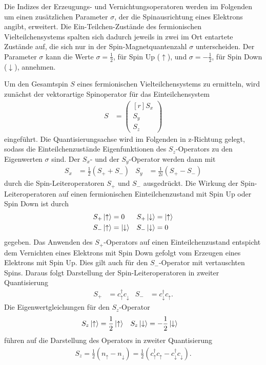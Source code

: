 Die Indizes der Erzeugungs- und Vernichtungsoperatoren werden im Folgenden um einen zusätzlichen Parameter $\sigma$, der die Spinausrichtung eines Elektrons angibt, erweitert.
Die Ein-Teilchen-Zustände des fermionischen Vielteilchensystems spalten sich dadurch jeweils in zwei im Ort entartete Zustände auf, die sich nur in der Spin-Magnetquantenzahl $\sigma$ unterscheiden.
Der Parameter $\sigma$ kann die Werte $\sigma = \frac12$, für Spin Up ($\uparrow$), und $\sigma = -\frac12$, für Spin Down ($\downarrow$), annehmen.

Um den Gesamtspin $S$ eines fermionischen Vielteilchensystems zu ermitteln, wird zunächst der vektorartige Spinoperator für das Einteilchensystem
\begin{align}
  S & = \begin{pmatrix*}[r]
    S_x \\
    S_y \\
    S_z
  \end{pmatrix*}
  \label{eqn:spinoperator}
\end{align}
eingeführt. Die Quantisierungsachse wird im Folgenden in z-Richtung gelegt, sodass die Einteilchenzustände Eigenfunktionen des $S_z$-Operators zu den Eigenwerten $\sigma$ sind.
Der $S_x$- und der $S_y$-Operator werden dann mit
\begin{align}
  S_x & = \frac12 \left(S_+ + S_- \right) & S_y &= \frac1{2i} \left(S_+ - S_- \right)
  \label{eqn:leiteroperatorenausdruck}
\end{align}
durch die Spin-Leiteroperatoren $S_+$ und $S_-$ ausgedrückt. Die Wirkung der Spin-Leiteroperatoren auf einen fermionischen Einteilchenzustand mit Spin Up oder Spin Down ist durch
\begin{align}
  S_+ \ket{\uparrow} & = 0 & S_+ \ket{\downarrow} & = \ket{\uparrow} \label{eqn:spluswirkung}\\
  S_- \ket{\uparrow} & = \ket{\downarrow} & S_- \ket{\downarrow} & = 0 \label{eqn:sminuswirkung}
\end{align}
gegeben. Das Anwenden des $S_+$-Operators auf einen Einteilchenzustand entspicht dem Vernichten eines Elektrons mit Spin Down gefolgt vom Erzeugen
eines Elektrons mit Spin Up. Dies gilt auch für den $S_-$-Operator mit vertauschten Spins. Daraus folgt Darstellung der Spin-Leiteroperatoren in zweiter Quantisierung
\begin{align}
  S_+ & = c_\uparrow^\dag c_\downarrow^{\phantom{\dag}} & S_- & = c_\downarrow^\dag c_\uparrow^{\phantom{\dag}}. \label{eqn:leitersecondquant}
\end{align}
Die Eigenwertgleichungen für den $S_z$-Operator
\begin{align}
  S_z \ket{\uparrow} &= \frac12 \ket{\uparrow} & S_z \ket{\downarrow} &= -\frac12 \ket{\downarrow}
\end{align}
führen auf die Darstellung des Operators in zweiter Quantisierung
\begin{align}
  S_z = \frac12 (n_\uparrow -  n_\downarrow) = \frac12 (c_\uparrow^\dag c_\uparrow^{\phantom{\dag}} - c_\downarrow^\dag c_\downarrow^{\phantom{\dag}}) \label{eqn:szsecondquant}.
\end{align}
\cite{schwabl}

